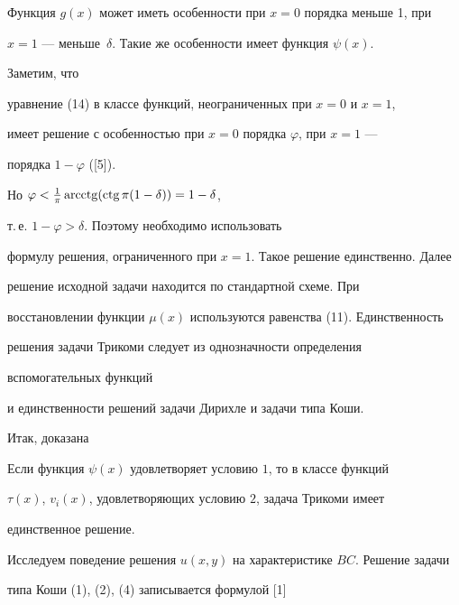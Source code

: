  


Функция $g(x)$ может иметь особенности при $x=0$ порядка меньше 1, при 


$x=1$ --- меньше~$\delta$. Такие же особенности имеет функция $\psi(x)$. 


Заметим, что 


уравнение (14) в классе функций, неограниченных при $x=0$ и $x=1$, 


имеет решение с особенностью при $x=0$ порядка $\varphi$, при $x=1$ --- 


порядка $1-\varphi$ ([5]). 


Но $\varphi<\frac{1}{\pi}\operatorname{arcctg}(\operatorname{ctg}\pi(1-\delta))=1-\delta$, 


т.\,е. $1-\varphi>\delta$. Поэтому необходимо использовать 


формулу решения, ограниченного при $x=1$. Такое решение единственно. Далее 


решение исходной задачи находится по стандартной схеме. При 


восстановлении функции $\mu(x)$ используются равенства (11). Единственность 


решения задачи Трикоми следует из однозначности определения 


вспомогательных функций 


и единственности решений задачи Дирихле и задачи типа Коши. 


 


Итак, доказана 


 


\begin{thm} 


Если функция $\psi(x)$ удовлетворяет условию $1$, то в классе функций 


$\tau(x)$, $v_i(x)$, удовлетворяющих условию $2$, задача Трикоми имеет 


единственное решение.


\end{thm} 


 


Исследуем поведение решения $u(x,y)$ на характеристике $BC$. Решение задачи 


типа Коши (1), (2), (4) записывается формулой [1] 


